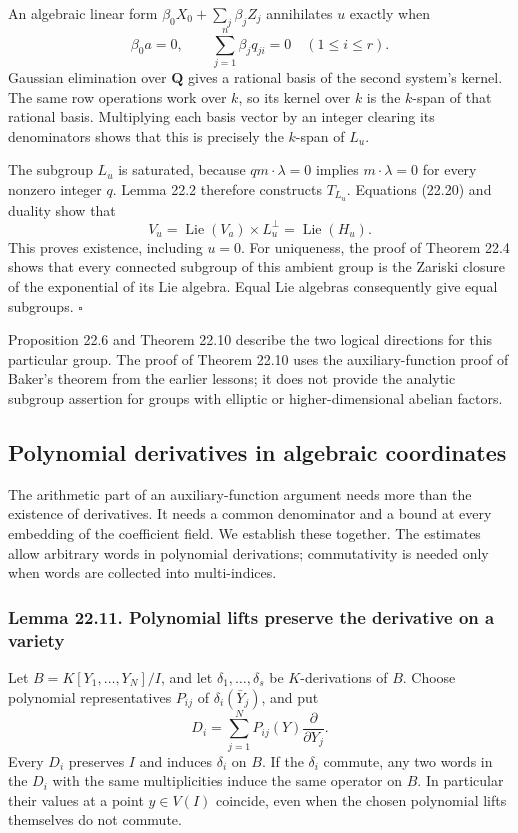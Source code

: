 \documentclass[
  11pt,
  a4paper,
]{article}
\begin{document}
An algebraic linear form \(\beta_0X_0+\sum_j\beta_jZ_j\) annihilates
\(u\) exactly when \[
 \beta_0a=0,\qquad
 \sum_{j=1}^n\beta_jq_{ji}=0\quad(1\le i\le r).
 \tag{22.20}
\] Gaussian elimination over \(\mathbf Q\) gives a rational basis of the
second system's kernel. The same row operations work over \(k\), so its
kernel over \(k\) is the \(k\)-span of that rational basis. Multiplying
each basis vector by an integer clearing its denominators shows that
this is precisely the \(k\)-span of \(L_u\).

The subgroup \(L_u\) is saturated, because \(qm\cdot\lambda=0\) implies
\(m\cdot\lambda=0\) for every nonzero integer \(q\). Lemma 22.2
therefore constructs \(T_{L_u}\). Equations (22.20) and duality show
that \[
 V_u=\operatorname{Lie}(V_a)\times L_u^\perp
     =\operatorname{Lie}(H_u).
\] This proves existence, including \(u=0\). For uniqueness, the proof
of Theorem 22.4 shows that every connected subgroup of this ambient
group is the Zariski closure of the exponential of its Lie algebra.
Equal Lie algebras consequently give equal subgroups. \(\square\)

Proposition 22.6 and Theorem 22.10 describe the two logical directions
for this particular group. The proof of Theorem 22.10 uses the
auxiliary-function proof of Baker's theorem from the earlier lessons; it
does not provide the analytic subgroup assertion for groups with
elliptic or higher-dimensional abelian factors.

\subsection{Polynomial derivatives in algebraic
coordinates}\label{polynomial-derivatives-in-algebraic-coordinates}

The arithmetic part of an auxiliary-function argument needs more than
the existence of derivatives. It needs a common denominator and a bound
at every embedding of the coefficient field. We establish these
together. The estimates allow arbitrary words in polynomial derivations;
commutativity is needed only when words are collected into
multi-indices.

\subsubsection{Lemma 22.11. Polynomial lifts preserve the derivative on
a
variety}\label{lemma-22.11.-polynomial-lifts-preserve-the-derivative-on-a-variety}

Let \(B=K[Y_1,\ldots,Y_N]/I\), and let \(\delta_1,\ldots,\delta_s\) be
\(K\)-derivations of \(B\). Choose polynomial representatives \(P_{ij}\)
of \(\delta_i(\bar Y_j)\), and put \[
 D_i=\sum_{j=1}^N P_{ij}(Y)\frac{\partial}{\partial Y_j}.
 \tag{22.21}
\] Every \(D_i\) preserves \(I\) and induces \(\delta_i\) on \(B\). If
the \(\delta_i\) commute, any two words in the \(D_i\) with the same
multiplicities induce the same operator on \(B\). In particular their
values at a point \(y\in V(I)\) coincide, even when the chosen
polynomial lifts themselves do not commute.
\end{document}
